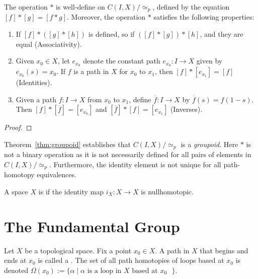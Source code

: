 \begin{theorem}\label{thm:groupoid}
    The operation $\ast$ is well-define on $C(I,X)/\simeq_p$, defined by the equation $[f] \ast [g] = [f \ast g]$. Moreover, the operation $\ast$ satisfies the following properties:
    \begin{enumerate}[label = (\alph*),itemsep=1pt,topsep=3pt]
        \item If $[f] \ast([g] \ast [h])$ is defined, so if $([f] \ast [g]) \ast [h]$, and they are equal (Associativity).
        \item Given $x_0 \in X$, let $e_{x_0}$ denote the constant path $e_{x_0}:I \rightarrow X$ given by $e_{x_0}(s) = x_0$. If $f$ is a path in $X$ for $x_0$ to $x_1$, then $[f] \ast [e_{x_1}] = [f]$ (Identities).
        \item Given a path $f:I \rightarrow X$ from $x_0$ to $x_1$, define $\overline{f}:I \rightarrow X$ by $\overline{f}(s) = f(1-s)$. Then $[f] \ast [\overline{f}] = [e_{x_0}]$ and $[\overline{f}] \ast [f] = [e_{x_1}]$ (Inverses).
    \end{enumerate}
\end{theorem}
    {\color{red} \begin{proof}
        
    \end{proof}}

\begin{remark}
    Theorem~\ref{thm:groupoid} establishes that $C(I,X)/\simeq_p$ is a \textit{groupoid}. Here $\ast$ is not a binary operation as it is not necessarily defined for all pairs of elements in $C(I,X)/\simeq_p$. Furthermore, the identity element is not unique for all path-homotopy equivalences.
\end{remark}

\begin{definition}
	A space $X$ is  if the identity map $i_X:X \rightarrow X$ is nullhomotopic.
\end{definition}

\section{The Fundamental Group}

\begin{definition}
    Let $X$ be a topological space. Fix a point $x_0 \in X$. A path in $X$ that begins and ends at $x_0$ is called a . The set of all path homotopies of loops based at $x_0$ is denoted $\Omega(x_0) := \{\alpha \mid \text{$\alpha$ is a loop in $X$ based at $x_0$ }\}$.
\end{definition}

